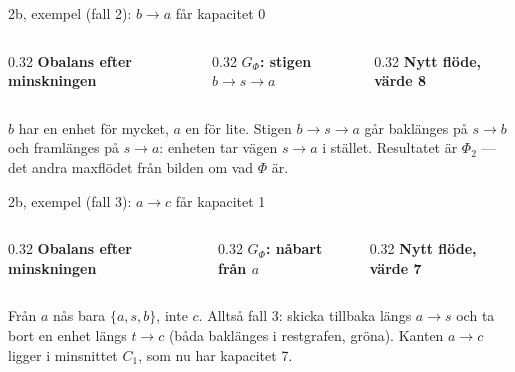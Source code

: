 \begin{frame}{2b, exempel (fall 2): $b\to a$ får kapacitet 0}
\begin{columns}[T]
\begin{column}{0.32\textwidth}
\centering
{\footnotesize\bfseries\color{kthnavy}Obalans efter minskningen}\par

\end{column}
\begin{column}{0.32\textwidth}
\centering
{\footnotesize\bfseries\color{kthnavy}$G_\Phi$: stigen $b\to s\to a$}\par

\end{column}
\begin{column}{0.32\textwidth}
\centering
{\footnotesize\bfseries\color{kthnavy}Nytt flöde, värde 8}\par

\end{column}
\end{columns}
\vfill
\small
$b$ har en enhet för mycket, $a$ en för lite. Stigen $b\to s\to a$ går baklänges på $s\to b$ och
framlänges på $s\to a$: enheten tar vägen $s\to a$ i stället. Resultatet är $\Phi_2$ — det andra
maxflödet från bilden om vad $\Phi$ är.
\end{frame}

\begin{frame}{2b, exempel (fall 3): $a\to c$ får kapacitet 1}
\begin{columns}[T]
\begin{column}{0.32\textwidth}
\centering
{\footnotesize\bfseries\color{kthnavy}Obalans efter minskningen}\par

\end{column}
\begin{column}{0.32\textwidth}
\centering
{\footnotesize\bfseries\color{kthnavy}$G_\Phi$: nåbart från $a$}\par

\end{column}
\begin{column}{0.32\textwidth}
\centering
{\footnotesize\bfseries\color{kthnavy}Nytt flöde, värde 7}\par

\end{column}
\end{columns}
\vfill
\small
Från $a$ nås bara $\{a,s,b\}$, inte $c$. Alltså fall 3: skicka tillbaka längs $a\to s$ och ta
bort en enhet längs $t\to c$ (båda baklänges i restgrafen, gröna). Kanten $a\to c$ ligger i
minsnittet $C_1$, som nu har kapacitet 7.
\end{frame}

